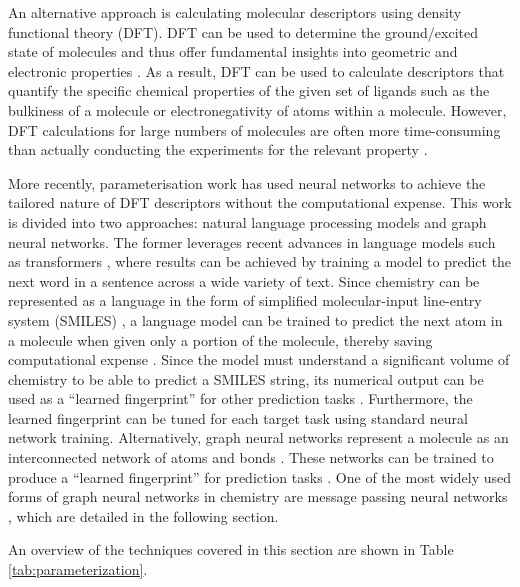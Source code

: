 An alternative approach is calculating molecular descriptors using density functional theory (DFT). DFT can be used to determine the ground/excited state of molecules and thus offer fundamental insights into geometric and electronic properties \cite{Shields2021}. As a result, DFT can be used to calculate descriptors that quantify the specific chemical properties of the given set of ligands such as the bulkiness of a molecule or electronegativity of atoms within a molecule. However, DFT calculations for large numbers of molecules are often more time-consuming than actually conducting the experiments for the relevant property \cite{Shields2021}.

More recently, parameterisation work has used neural networks to achieve the tailored nature of DFT descriptors without the computational expense. This work is divided into two approaches: natural language processing models and graph neural networks. The former leverages recent advances in language models such as transformers \cite{Vaswani2017}, where results can be achieved by training a model to predict the next word in a sentence across a wide variety of text. Since chemistry can be represented as a language in the form of simplified molecular-input line-entry system (SMILES) \cite{Weininger1988}, a language model can be trained to predict the next atom in a molecule when given only a portion of the molecule, thereby saving computational expense \cite{Schwaller2019}. Since the model must understand a significant volume of chemistry to be able to predict a SMILES string, its numerical output can be used as a “learned fingerprint” for other prediction tasks \cite{Schwaller2021, Pomberger2023}. Furthermore, the learned fingerprint can be tuned for each target task using standard neural network training. Alternatively, graph neural networks represent a molecule as an interconnected network of atoms and bonds \cite{Kearnes2016}. These networks can be trained to produce a “learned fingerprint” for prediction tasks \cite{Yang2019}. One of the most widely used forms of graph neural networks in chemistry are message passing neural networks \cite{Gilmer2017}, which are detailed in the following section.

An overview of the techniques covered in this section are shown in Table \ref{tab:parameterization}.

